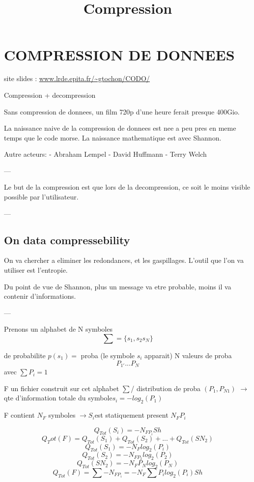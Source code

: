 \documentclass[a4paper,11pt]{article}
\title{Compression}
\author{}
\begin{document}
\maketitle
\tableofcontents
\newpage
\hypersetup {
linkcolor=blue,
filecolor=magenta,
urlcolor=cyan
citecolor=blue}

\section{COMPRESSION DE DONNEES}

site slides : \url{www.lrde.epita.fr/~gtochon/CODO/}

Compression + decompression

Sans compression de donnees, un film 720p d'une heure ferait presque 400Gio.

La naissance naive de la compression de donnees est nee a peu pres en meme
temps que le code morse.
La naissance mathematique est avec Shannon.

Autre acteurs:
  - Abraham Lempel
  - David Huffmann
  - Terry Welch

---

Le but de la compression est que lors de la decompression, ce soit le moins
visible possible par l'utilisateur.

---

\subsection{On data compressebility} 

On va chercher a eliminer les redondances, et les gaspillages.
L'outil que l'on va utiliser est l'entropie.

Du point de vue de Shannon, plus un message va etre probable, moins il va
contenir d'informations.

---

Prenons un alphabet de N symboles
$$ \sum = \{s_{1},s_{2} s_{N}\} $$

de probabilite  $ p(s_{1})  = $ proba (le symbole  $s_{i}$ apparait)
  N valeurs de proba $$P_{1'} ... P_{N}$$ avec $ \sum P_{i} = 1 $

F un  fichier construit sur cet alphabet $ \sum $/ distribution de proba 
$(P_{1} , P_{N1})$
  $\rightarrow$ qte d'information totale du symbole$ s_{i} = -log_{2}(P_{1})$

F contient $N_{F}$ symboles $\rightarrow S_{i} $est statiquement present $N_{F}P_{i} $

$$
Q_{Tot}(S_{i}) = - N_{FP_{i}} Sh
$$ $$
Q_Tot(F) = Q_{Tot}(S_{1}) + Q_{Tot}(S_{2}) + ... + Q_{Tot}(S{N_{2}})
$$ $$
Q_{Tot}(S_{1}) = -N_{F}log_{2}(P_{i})
$$ $$
Q_{Tot}(S_{2}) = -N_{FP_{2}}log_{2}(P_{2})
$$ $$
Q_{Tot}(S{N_{2}}) = -N_{F}P_{N}log_{2}(P_{N})
$$ $$
Q_{Tot}(F) =  \sum -N_{FP_{i}}
= -N_{F} \sum P_{i}log_{2}(P_{i}) Sh
$$
\end{document}
